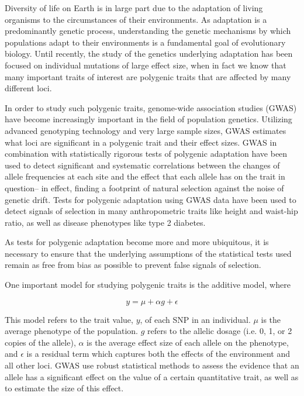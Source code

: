 \documentclass[a4paper,10pt]{article}
\begin{document}
Diversity of life on Earth is in large part due to the adaptation of living
organisms to the circumstances of their environments. As adaptation is
a predominantly genetic process, understanding the genetic mechanisms
by which populations adapt to their environments is a fundamental goal
of evolutionary biology. Until recently, the study of the genetics
underlying adaptation has been focused on individual mutations of large
effect size, when in fact we know that many important traits of interest are polygenic traits that are affected by many
different loci.

In order to study such polygenic traits, genome-wide association studies (GWAS) have become increasingly
important in the field of population genetics. Utilizing advanced
genotyping technology and very large sample sizes, GWAS estimates what
loci are significant in a polygenic trait and their effect sizes. GWAS in combination with statistically rigorous tests of
polygenic adaptation have been used to detect significant and
systematic correlations between the changes of allele frequencies at
each site and the effect that each allele has on the trait in
question-- in effect, finding a footprint of natural selection
against the noise of genetic drift. Tests for polygenic
adaptation using GWAS data have been used to detect signals of
selection in many anthropometric traits like height
and waist-hip ratio, as well as disease phenotypes like type 2
diabetes\cite{gwasintro,gwasproblems}.

As tests for polygenic adaptation become more and more ubiquitous, it is necessary to ensure that the underlying
assumptions of the statistical tests used remain as free from bias as
possible to prevent false signals of selection. 

One important model for studying polygenic traits is the additive model, where

\begin{equation}
  y = \mu + \alpha g + \epsilon
\end{equation}

This model refers to the trait value, $y$, of each SNP in an
individual. $\mu$ is the average phenotype of the population. $g$ refers to the
allelic dosage (i.e. 0, 1, or 2 copies of the allele), $\alpha$ is the average effect size
of each allele on the phenotype, and $ \epsilon $ is a residual term which captures both the
effects of the environment and all other loci. GWAS use robust statistical methods
to assess the evidence that an allele has a
significant effect on the value of a certain quantitative
trait, as well as to estimate the size of this effect.
\end{document}
